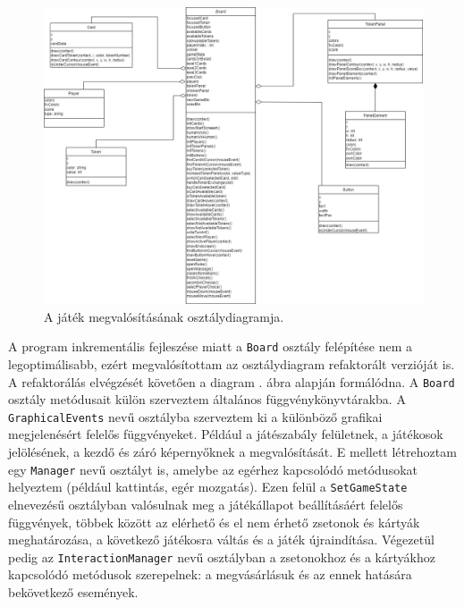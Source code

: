 \begin{figure}[H]
\centering
\includegraphics[width=\textwidth]{images/UML.png}
\caption{A játék megvalósításának osztálydiagramja.}
\label{fig:uml}
\end{figure}

A program inkrementális fejleszése miatt a \texttt{Board} osztály felépítése nem a legoptimálisabb, ezért megvalósítottam az osztálydiagram refaktorált verzióját is. A refaktorálás elvégzését követően a diagram . ábra alapján formálódna. A \texttt{Board} osztály metódusait külön szerveztem általános függvénykönyvtárakba. A \\ \texttt{GraphicalEvents} nevű osztályba szerveztem ki a különböző grafikai megjelenésért felelős függvényeket. Például a játészabály felületnek, a játékosok jelölésének, a kezdő és záró képernyőknek a megvalósítását. E mellett létrehoztam egy \texttt{Manager} nevű osztályt is, amelybe az egérhez kapcsolódó metódusokat helyeztem (például kattintás, egér mozgatás). Ezen felül a \texttt{SetGameState} elnevezésű osztályban valósulnak meg a játékállapot beállításáért felelős függvények, többek között az elérhető és el nem érhető zsetonok és kártyák meghatározása, a következő játékosra váltás és a játék újraindítása. Végezetül pedig az \texttt{InteractionManager} nevű osztályban a zsetonokhoz és a kártyákhoz kapcsolódó metódusok szerepelnek: a megvásárlásuk és az ennek hatására bekövetkező események.

